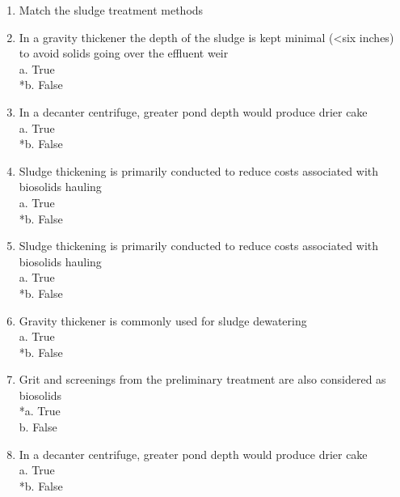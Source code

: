 \documentclass{article}
\begin{document}
\begin{enumerate}
\item  Match the sludge treatment methods \\

\item  In a gravity thickener the depth of the sludge is kept minimal (<six inches) to avoid solids going over the effluent weir \\

a. True \\
*b. False \\

\item  In a decanter centrifuge, greater pond depth would produce drier cake \\

a. True \\
*b. False \\

\item  Sludge thickening is primarily conducted to reduce costs associated with biosolids hauling\\

a. True \\
*b. False \\

\item  Sludge thickening is primarily conducted to reduce costs associated with biosolids hauling \\

a. True \\
*b. False \\

\item  Gravity thickener is commonly used for sludge dewatering \\

a. True \\
*b. False \\

\item  Grit and screenings from the preliminary treatment are also considered as biosolids \\

*a. True \\
b. False \\

\item  In a decanter centrifuge, greater pond depth would produce drier cake \\

a. True \\
*b. False \\


\end{enumerate}
\end{document}
